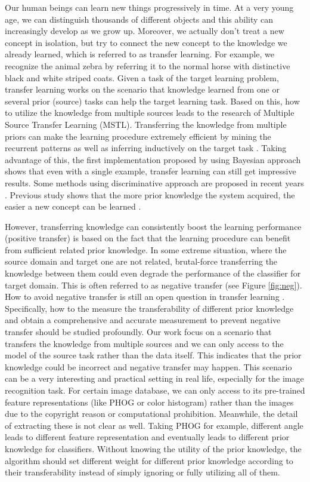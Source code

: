 Our human beings can learn new things progressively in time. At a very young age, we can distinguish thousands of different objects and this ability can increasingly develop as we grow up. Moreover, we actually don't treat a new concept in isolation, but try to connect the new concept to the knowledge we already learned, which is referred to as transfer learning. For example, we recognize the animal zebra by referring it to the normal horse with distinctive black and white striped coats. Given a task of the target learning problem, transfer learning works on the scenario that knowledge learned from one or several prior (source) tasks can help the target learning task. 
Based on this, how to utilize the knowledge from multiple sources leads to the research of Multiple Source Transfer
Learning (MSTL). Transferring the knowledge from multiple priors can make the learning procedure extremely efficient by mining the recurrent patterns as well as inferring inductively on the target task \cite{tommasi2014learning}. Taking advantage of this, the first implementation proposed by \cite{fei2006one} using Bayesian approach shows that even with a single example, transfer learning can still get impressive results. Some methods using discriminative approach are proposed in recent years \cite{tommasi2014learning} \cite{kuzborskij2013n} \cite{jie2011multiclass}. Previous study shows that the more prior knowledge the system acquired, the easier a new concept can be learned \cite{Thrun96islearning}.

However, transferring knowledge can consistently boost the learning performance (positive transfer) is based on the fact that the learning procedure can benefit from sufficient related prior knowledge. In some extreme situation, where the source domain and target one are not related, brutal-force transferring the knowledge between them could even degrade the performance of the classifier for target domain. This is often referred to as negative transfer (see Figure \ref{fig:neg}). How to avoid negative transfer is still an open question in transfer learning \cite{Lu201514}. Specifically, how to the measure the transferability of different prior knowledge and obtain a comprehensive and accurate measurement to prevent negative transfer should be studied profoundly. Our work focus on a scenario that transfers the knowledge from multiple sources and we can only access to the model of the source task rather than the data itself. This indicates that the prior knowledge could be incorrect and negative transfer may happen. This scenario can be a very interesting and practical setting in real life, especially for the image recognition task. For certain image database, we can only access to its pre-trained feature representations (like PHOG or color histogram) rather than the images due to the copyright reason or computational prohibition. Meanwhile, the detail of extracting these is not clear as well. Taking PHOG for example, different angle leads to different feature representation and eventually leads to different prior knowledge for classifiers. Without knowing the utility of the prior knowledge, the algorithm should set different weight for different prior knowledge according to their transferability instead of simply ignoring or fully utilizing all of them.

